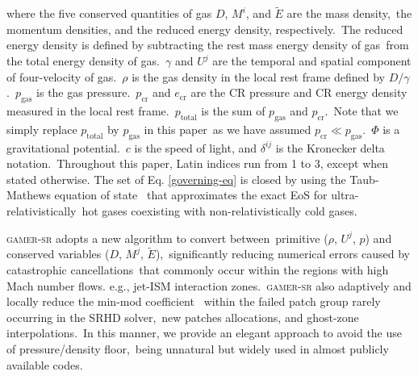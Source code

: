 \documentclass[fleqn,usenatbib,useAMS]{mnras}
\begin{document}
  where the five conserved quantities of gas $D$, $M^{i}$, and $\tilde{E}$ are the mass density,\
  the momentum densities, and the reduced energy density, respectively.\
  The reduced energy density is defined by subtracting the rest mass energy density of gas\
  from the total energy density of gas.\
  $\gamma$ and $U^{j}$ are the temporal and spatial component of four-velocity of gas.\
  $\rho$ is the gas density in the local rest frame defined by $D/\gamma$.\
  $p_{\text{gas}}$ is the gas pressure.\
  $p_{\text{cr}}$ and $e_{\text{cr}}$ are the CR pressure and CR energy density measured in the local rest frame.\
  $p_{\text{total}}$ is the sum of $p_{\text{gas}}$ and $p_{\text{cr}}$.\
  Note that we simply replace $p_{\text{total}}$ by $p_{\text{gas}}$ in this paper\
  as we have assumed $p_{\text{cr}}\ll p_{\text{gas}}$.\
  $\Phi$ is a gravitational potential.\
  $c$ is the speed of light, and $\delta^{ij}$ is the Kronecker delta notation.\
  Throughout this paper, Latin indices run from 1 to 3, except when stated otherwise. The set of Eq. \ref{governing-eq} is closed by using the Taub-Mathews equation of state \citep[EoS;][]{Taub,TM_EOS}\
  that approximates the exact EoS \citep{Synge} for ultra-relativistically\
  hot gases coexisting with non-relativistically cold gases.

  \textsc{gamer-sr} adopts a new algorithm \citep{tseng2021} to convert between\
  primitive ($\rho$, $U^{j}$, $p$) and conserved variables ($D$, $M^{j}$, $\tilde{E}$),\
  significantly reducing numerical errors caused by catastrophic cancellations\
  that commonly occur within the regions with high Mach number flows. e.g., jet-ISM interaction zones.\
  \textsc{gamer-sr} also adaptively and locally reduce the min-mod coefficient\
  \citep{tseng2021} within the failed patch group rarely occurring in the SRHD solver,\
  new patches allocations, and ghost-zone interpolations.\
  In this manner, we provide an elegant approach to avoid the use of pressure/density floor,\
  being unnatural but widely used in almost publicly available codes.\
\end{document}

